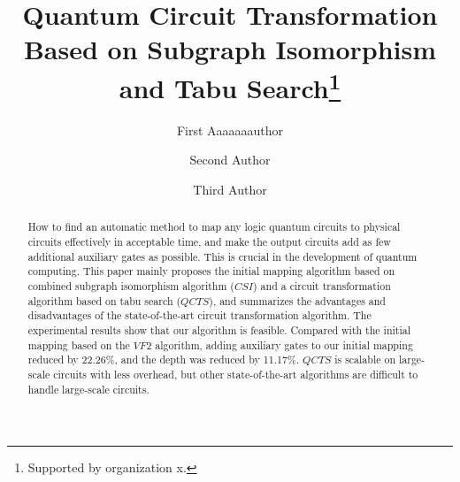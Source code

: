 \documentclass[runningheads]{llncs}
\begin{document}
%
\title{Quantum Circuit Transformation Based on Subgraph Isomorphism and Tabu Search\thanks{Supported by organization x.}}
%
%
\author{First Aaaaaaauthor \and
Second Author \and
Third Author}
%
%
%
\maketitle              %
%
\begin{abstract}
	How to find an automatic method to map any logic quantum circuits to
	physical circuits effectively in acceptable time, 
	and make the output circuits add as few additional auxiliary gates as possible. 
	This is crucial in the development of quantum computing.
	This paper mainly proposes the initial mapping algorithm 
	based on combined subgraph isomorphism algorithm ($CSI$)
	and a circuit transformation algorithm based on tabu search ($QCTS$), 
	and summarizes the advantages and disadvantages of the state-of-the-art 
	circuit transformation algorithm.
	The experimental results show that our algorithm is feasible.
	Compared with the initial mapping based on the $VF2$ algorithm, 
	adding auxiliary gates to our initial mapping reduced by 22.26\%, and the depth was reduced by 11.17\%.
	$QCTS$ is scalable on large-scale circuits with less overhead,
	but other state-of-the-art algorithms are difficult to handle large-scale circuits. 
\end{abstract}
\end{document}
